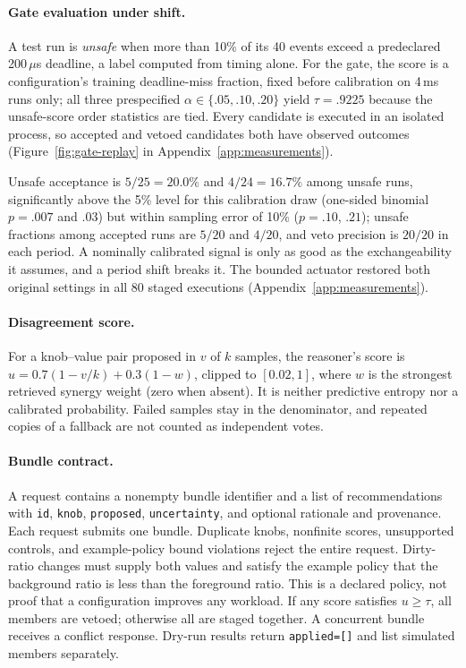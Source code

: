 \paragraph{Gate evaluation under shift.}\label{subsec:gate}
A test run is \emph{unsafe} when more than 10\% of its 40 events exceed a predeclared 200\,$\mu$s deadline, a label computed from timing alone. For the gate, the score is a configuration's training deadline-miss fraction, fixed before calibration on 4\,ms runs only; all three prespecified $\alpha\in\{.05,.10,.20\}$ yield $\tau=.9225$ because the unsafe-score order statistics are tied. Every candidate is executed in an isolated process, so accepted and vetoed candidates both have observed outcomes (Figure~\ref{fig:gate-replay} in Appendix~\ref{app:measurements}).

Unsafe acceptance is $5/25=20.0\%$ and $4/24=16.7\%$ among unsafe runs, significantly above the 5\% level for this calibration draw (one-sided binomial $p=.007$ and $.03$) but within sampling error of 10\% ($p=.10$, $.21$); unsafe fractions among accepted runs are $5/20$ and $4/20$, and veto precision is $20/20$ in each period. A nominally calibrated signal is only as good as the exchangeability it assumes, and a period shift breaks it. The bounded actuator restored both original settings in all 80 staged executions (Appendix~\ref{app:measurements}).

\paragraph{Disagreement score.}
For a knob--value pair proposed in $v$ of $k$ samples, the reasoner's score is $u=0.7(1-v/k)+0.3(1-w)$, clipped to $[0.02,1]$, where $w$ is the strongest retrieved synergy weight (zero when absent). It is neither predictive entropy nor a calibrated probability. Failed samples stay in the denominator, and repeated copies of a fallback are not counted as independent votes.

\paragraph{Bundle contract.}
A request contains a nonempty bundle identifier and a list of recommendations with \texttt{id}, \texttt{knob}, \texttt{proposed}, \texttt{uncertainty}, and optional rationale and provenance. Each request submits one bundle. Duplicate knobs, nonfinite scores, unsupported controls, and example-policy bound violations reject the entire request. Dirty-ratio changes must supply both values and satisfy the example policy that the background ratio is less than the foreground ratio. This is a declared policy, not proof that a configuration improves any workload. If any score satisfies $u\ge\tau$, all members are vetoed; otherwise all are staged together. A concurrent bundle receives a conflict response. Dry-run results return \texttt{applied=[]} and list simulated members separately.

